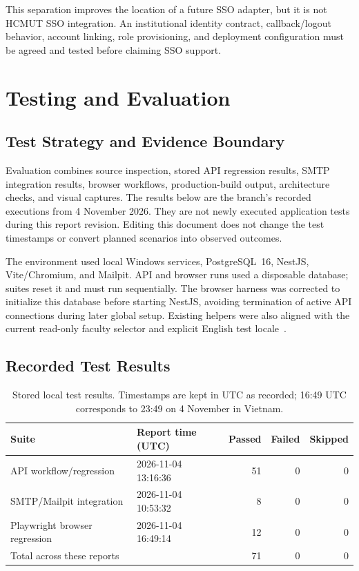 \documentclass[11pt,a4paper]{report}
\newcommand{\code}[1]{{\small\texttt{\detokenize{#1}}}}
\begin{document}
This separation improves the location of a future SSO adapter, but it is not HCMUT SSO integration. An institutional identity contract, callback/logout behavior, account linking, role provisioning, and deployment configuration must be agreed and tested before claiming SSO support.

\chapter{Testing and Evaluation}
\label{ch:evaluation}

\section{Test Strategy and Evidence Boundary}
Evaluation combines source inspection, stored API regression results, SMTP integration results, browser workflows, production-build output, architecture checks, and visual captures. The results below are the branch's recorded executions from 4 November 2026. They are not newly executed application tests during this report revision. Editing this document does not change the test timestamps or convert planned scenarios into observed outcomes.

The environment used local Windows services, PostgreSQL~16, NestJS, Vite/Chromium, and Mailpit. API and browser runs used a disposable \code{thesis_test} database; suites reset it and must run sequentially. The browser harness was corrected to initialize this database before starting NestJS, avoiding termination of active API connections during later global setup. Existing helpers were also aligned with the current read-only faculty selector and explicit English test locale~\cite{validation}.

\section{Recorded Test Results}
\begin{table}[htbp]
\centering\small
\begin{tabularx}{\textwidth}{@{}Y p{0.26\textwidth} r r r@{}}
\toprule
\textbf{Suite} & \textbf{Report time (UTC)} & \textbf{Passed} & \textbf{Failed} & \textbf{Skipped} \\
\midrule
API workflow/regression & 2026-11-04 13:16:36 & 51 & 0 & 0 \\
SMTP/Mailpit integration & 2026-11-04 10:53:32 & 8 & 0 & 0 \\
Playwright browser regression & 2026-11-04 16:49:14 & 12 & 0 & 0 \\
\midrule
Total across these reports & & 71 & 0 & 0 \\
\bottomrule
\end{tabularx}
\caption{Stored local test results. Timestamps are kept in UTC as recorded; 16:49 UTC corresponds to 23:49 on 4 November in Vietnam.}
\label{tab:test-results}
\end{table}
\end{document}

